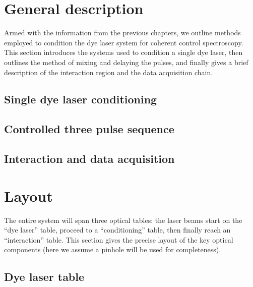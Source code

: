 %
\section{General description}
Armed with the information from the previous chapters, we outline methods employed to condition the dye laser system for coherent control spectroscopy. This section introduces the systems used to condition a single dye laser, then outlines the method of mixing and delaying the pulses, and finally gives a brief description of the interaction region and the data acquisition chain.
\subsection{Single dye laser conditioning}

\subsection{Controlled three pulse sequence}

\subsection{Interaction and data acquisition}

\section{Layout}
The entire system will span three optical tables: the laser beams start on the ``dye laser'' table, proceed to a ``conditioning'' table, then finally reach an ``interaction'' table. This section gives the precise layout of the key optical components (here we assume a pinhole will be used for completeness).
\subsection{Dye laser table}

